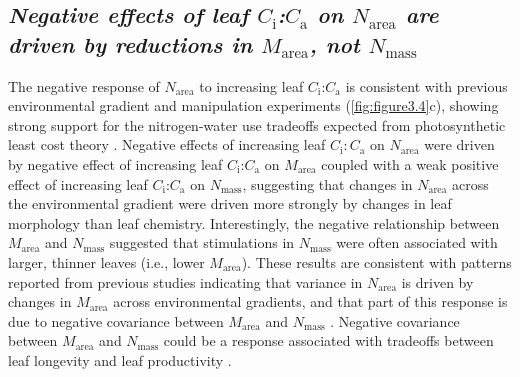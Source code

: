 \begin{singlespace}
\subsection{\textit{Negative effects of leaf $C_\mathrm{i}$:$C_\mathrm{a}$ on $N_\mathrm{area}$ are driven by reductions in $M_\mathrm{area}$, not $N_\mathrm{mass}$}}
\end{singlespace}
\noindent The negative response of $N_\mathrm{area}$ to increasing leaf $C_\mathrm{i}$:$C_\mathrm{a}$ is consistent with previous environmental gradient  and manipulation experiments (\ref{fig:figure3.4}c), showing strong support for the nitrogen-water use tradeoffs expected from photosynthetic least cost theory . Negative effects of increasing leaf $C_\mathrm{i}\mathrm{:}C_\mathrm{a}$ on $N_\mathrm{area}$ were driven by  negative effect of increasing leaf $C_\mathrm{i}$:$C_\mathrm{a}$ on $M_\mathrm{area}$ coupled with a weak positive effect of increasing leaf $C_\mathrm{i}$:$C_\mathrm{a}$ on $N_\mathrm{mass}$, suggesting that changes in $N_\mathrm{area}$ across the environmental gradient were driven more strongly by changes in leaf morphology than leaf chemistry. Interestingly, the negative relationship between $M_\mathrm{area}$ and $N_\mathrm{mass}$ suggested that stimulations in $N_\mathrm{mass}$ were often associated with larger, thinner leaves (i.e., lower $M_\mathrm{area}$). These results are consistent with patterns reported from previous studies indicating that variance in $N_\mathrm{area}$ is driven by changes in $M_\mathrm{area}$ across environmental gradients, and that part of this response is due to negative covariance between $M_\mathrm{area}$ and $N_\mathrm{mass}$ . Negative covariance between $M_\mathrm{area}$ and $N_\mathrm{mass}$ could be a response associated with tradeoffs between leaf longevity and leaf productivity .

